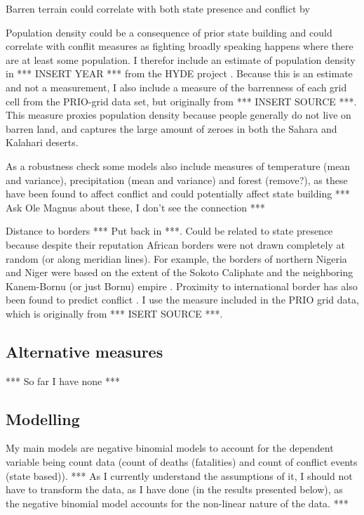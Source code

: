 \documentclass[12pt]{article}
\begin{document}
Barren terrain could correlate with both state presence and conflict by 

Population density could be a consequence of prior state building and could
correlate with conflit measures as fighting broadly speaking happens where there
are at least some population. I therefor include an estimate of population
density in *** INSERT YEAR *** from the HYDE project \citep{Goldewijk2016}.
Because this is an estimate and not a measurement, I also include a measure of
the barrenness of each grid cell from the PRIO-grid data set, but originally
from *** INSERT SOURCE ***. This measure proxies population density because
people generally do not live on barren land, and captures the large amount of
zeroes in both the Sahara and Kalahari deserts.

As a robustness check some models also include measures of temperature (mean and
variance), precipitation (mean and variance) and forest (remove?), as these have
been found to affect conflict and could potentially affect state building ***
Ask Ole Magnus about these, I don't see the connection ***

Distance to borders *** Put back in ***. Could be related to state presence
because despite their reputation African borders were not drawn completely at
random (or along meridian lines). For example, the borders of northern Nigeria
and Niger were based on the extent of the Sokoto Caliphate and the neighboring
Kanem-Bornu (or just Bornu) empire \citep{HiribarrenVincent2017AHoB}. Proximity
to international border has also been found to predict conflict
\citep{Buhaug2002}. I use the measure included in the PRIO grid data, which is
originally from *** ISERT SOURCE ***.

\subsection{Alternative measures}

*** So far I have none ***

\subsection{Modelling}

My main models are negative binomial models to account for the dependent
variable being count data (count of deaths (fatalities) and count of conflict
events (state based)). *** As I currently understand the assumptions of it, I
should not have to transform the data, as I have done (in the results presented
below), as the negative binomial model accounts for the non-linear nature of the
data. ***
\end{document}
